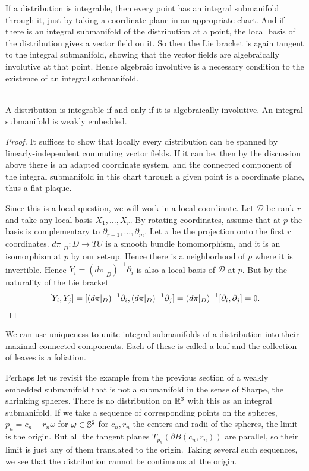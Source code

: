 If a distribution is integrable, then every point has an integral submanifold through it, just by taking a coordinate plane in an appropriate chart.
And if there is an integral submanifold of the distribution at a point, the local basis of the distribution gives a vector field on it.
So then the Lie bracket is again tangent to the integral submanifold, showing that the vector fields are algebraically involutive at that point.
Hence algebraic involutive is a necessary condition to the existence of an integral submanifold.

\begin{theorem}
\textup{\cite[Thm~2.4.1,~Cor~2.4.2]{Sharpe1997}\cite[Thm~1.60]{Warner1983}\cite[Thm~19.2]{Lee2012}} \\
A distribution is integrable if and only if it is algebraically involutive.
An integral submanifold is weakly embedded.
\end{theorem}
\begin{proof}
It suffices to show that locally every distribution can be spanned by linearly-independent commuting vector fields.
If it can be, then by the discussion above there is an adapted coordinate system, and the connected component of the integral submanifold in this chart through a given point is a coordinate plane, thus a flat plaque.

Since this is a local question, we will work in a local coordinate.
Let $\mathcal{D}$ be rank $r$ and take any local basis $X_1, \dots, X_r$.
By rotating coordinates, assume that at $p$ the basis is complementary to $\partial_{r+1},\dots,\partial_{m}$.
Let $\pi$ be the projection onto the first $r$ coordinates.
$d\pi|_D : D \to TU$ is a smooth bundle homomorphism, and it is an isomorphism at $p$ by our set-up.
Hence there is a neighborhood of $p$ where it is invertible.
Hence $Y_i = (d\pi|_D)^{-1} \partial_i$ is also a local basis of $\mathcal{D}$ at $p$.
But by the naturality of the Lie bracket 
\[
[Y_i, Y_j] 
= [(d\pi|_D)^{-1} \partial_i, (d\pi|_D)^{-1} \partial_j]
= (d\pi|_D)^{-1} [\partial_i, \partial_j]
= 0.
\qedhere
\]
\end{proof}

We can use uniqueness to unite integral submanifolds of a distribution into their maximal connected components.
Each of these is called a leaf and the collection of leaves is a foliation.

Perhaps let us revisit the example from the previous section of a weakly embedded submanifold that is not a submanifold in the sense of Sharpe, the shrinking spheres.
There is no distribution on $\mathbb{R}^3$ with this as an integral submanifold. 
If we take a sequence of corresponding points on the spheres, $p_n = c_n + r_n \omega$ for $\omega \in \mathbb{S}^2$ for $c_n,r_n$ the centers and radii of the spheres, the limit is the origin. 
But all the tangent planes $T_{p_n}(\partial B(c_n,r_n))$ are parallel, so their limit is just any of them translated to the origin.
Taking several such sequences, we see that the distribution cannot be continuous at the origin.


